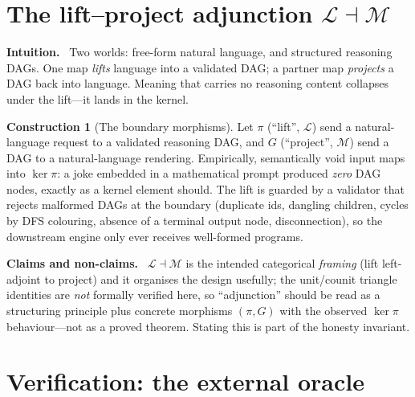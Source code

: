 \documentclass[11pt]{article}
\theoremstyle{definition}
\newtheorem{construction}[definition]{Construction}
\theoremstyle{plain}
\theoremstyle{remark}
\newcommand{\Intu}{\noindent\textbf{\color{intuitioncol}Intuition.}\ }
\newcommand{\Hon}{\noindent\textbf{\color{honestycol}Claims and non-claims.}\ }
\begin{document}
\section{The lift--project adjunction \texorpdfstring{$\mathcal L\dashv\mathcal M$}{L -| M}}\label{sec:adjunction}

\begin{intu}\Intu
Two worlds: free-form natural language, and structured reasoning DAGs. One map
\emph{lifts} language into a validated DAG; a partner map \emph{projects} a DAG back
into language. Meaning that carries no reasoning content collapses under the lift---it
lands in the kernel.
\end{intu}

\begin{construction}[The boundary morphisms]
Let $\pi$ (``lift'', $\mathcal L$) send a natural-language request to a validated
reasoning DAG, and $G$ (``project'', $\mathcal M$) send a DAG to a natural-language
rendering. Empirically, semantically void input maps into $\ker\pi$: a joke embedded
in a mathematical prompt produced \emph{zero} DAG nodes, exactly as a kernel element
should. The lift is guarded by a validator that rejects malformed DAGs at the boundary
(duplicate ids, dangling children, cycles by DFS colouring, absence of a terminal
output node, disconnection), so the downstream engine only ever receives well-formed
programs.
\end{construction}

\begin{hon}\Hon
$\mathcal L\dashv\mathcal M$ is the intended categorical \emph{framing}
(lift left-adjoint to project) and it organises the design usefully; the unit/counit
triangle identities are \emph{not} formally verified here, so ``adjunction'' should be
read as a structuring principle plus concrete morphisms $(\pi,G)$ with the observed
$\ker\pi$ behaviour---not as a proved theorem. Stating this is part of the honesty
invariant.
\end{hon}

\section{Verification: the external oracle}\label{sec:verify}
\end{document}
